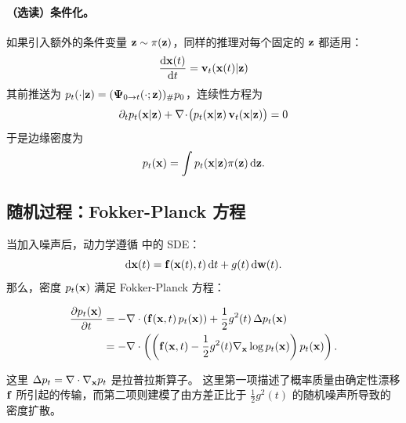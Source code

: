 \paragraph{（选读）条件化。}
如果引入额外的条件变量 ${\mathbf{z}} \sim \pi({\mathbf{z}})$，同样的推理对每个固定的 ${\mathbf{z}}$ 都适用：
\[
\frac{\mathop{}\!\mathrm{d} {\mathbf{x}}(t)}{\mathop{}\!\mathrm{d} t}={\mathbf{v}}_t({\mathbf{x}}(t)|{\mathbf{z}})
\]
其前推送为 $p_t(\cdot|{\mathbf{z}})=({\bm{\Psi}}_{0\to t}(\cdot;{\mathbf{z}}))_{\#}p_0$，连续性方程为
\[
\partial_t p_t({\mathbf{x}}|{\mathbf{z}})+\nabla\!\cdot\!\big(p_t({\mathbf{x}}|{\mathbf{z}})\,{\mathbf{v}}_t({\mathbf{x}}|{\mathbf{z}})\big)=0
\]
于是边缘密度为
\[
p_t({\mathbf{x}})=\int p_t({\mathbf{x}}|{\mathbf{z}})\pi({\mathbf{z}})\mathop{}\!\mathrm{d}{\mathbf{z}}.
\]










\subsection{随机过程：Fokker-Planck 方程}\label{subsec:cov-fpe}

当加入噪声后，动力学遵循  中的 SDE：
\[
\mathop{}\!\mathrm{d} {\mathbf{x}}(t) = {\mathbf{f}}({\mathbf{x}}(t), t)\mathop{}\!\mathrm{d} t + g(t)\mathop{}\!\mathrm{d} {\mathbf{w}}(t).
\]
那么，密度 $ p_t({\mathbf{x}}) $ 满足 Fokker-Planck 方程：
\begin{mdframed}
    \begin{align*}
    \frac{\partial p_t({\mathbf{x}})}{\partial t}
    &= - \nabla \cdot \left( {\mathbf{f}}({\mathbf{x}}, t)\, p_t({\mathbf{x}}) \right)
    + \frac{1}{2} g^2(t)\, \Delta p_t({\mathbf{x}})
    \\& = - \nabla \cdot \left(  \left({{\mathbf{f}}({\mathbf{x}}, t)}-{\frac{1}{2} g^2(t) \nabla_{\mathbf{x}} \log p_t({\mathbf{x}})}\right) p_t({\mathbf{x}})\right).
\end{align*}
\end{mdframed}
这里 $ \Delta p_t = \nabla \cdot \nabla_{\mathbf{x}} p_t $ 是拉普拉斯算子。
这里第一项描述了概率质量由确定性漂移 ${\mathbf{f}}$ 所引起的传输，而第二项则建模了由方差正比于 $\tfrac{1}{2} g^2(t) $ 的随机噪声所导致的密度扩散。

